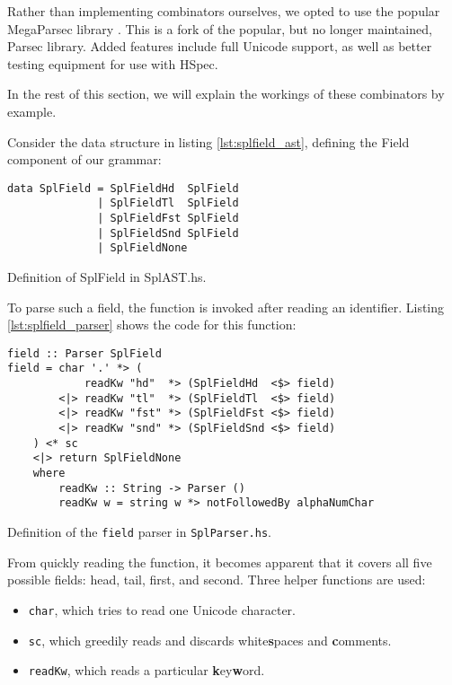 Rather than implementing combinators ourselves, we opted to use the popular MegaParsec library \cite{MegaParsec}.
This is a fork of the popular, but no longer maintained, Parsec library.
Added features include full Unicode support, as well as better testing equipment for use with HSpec.

In the rest of this section, we will explain the workings of these combinators by example.

Consider the data structure in listing \ref{lst:splfield_ast}, defining the \textsf{Field} component of our grammar:

\begin{listing}
\begin{verbatim}
data SplField = SplFieldHd  SplField
              | SplFieldTl  SplField
              | SplFieldFst SplField
              | SplFieldSnd SplField
              | SplFieldNone
\end{verbatim}
\caption{Definition of SplField in SplAST.hs.}
\label{lst:splfield_ast}
\end{listing}

To parse such a field, the  function is invoked after reading an identifier.
Listing \ref{lst:splfield_parser} shows the code for this function:

\begin{listing}
\begin{verbatim}
field :: Parser SplField
field = char '.' *> (
            readKw "hd"  *> (SplFieldHd  <$> field)
        <|> readKw "tl"  *> (SplFieldTl  <$> field)
        <|> readKw "fst" *> (SplFieldFst <$> field)
        <|> readKw "snd" *> (SplFieldSnd <$> field)
    ) <* sc
    <|> return SplFieldNone
    where
        readKw :: String -> Parser ()
        readKw w = string w *> notFollowedBy alphaNumChar
\end{verbatim}
\caption{Definition of the \texttt{field} parser in \texttt{SplParser.hs}.}
\label{lst:splfield_parser}
\end{listing}

From quickly reading the function, it becomes apparent that it covers all five possible fields: head, tail, first, and second.
Three helper functions are used:
\begin{itemize}
	\setlength{\itemsep}{0pt}
	\item \texttt{char}, which tries to read one Unicode character.
	\item \texttt{sc}, which greedily reads and discards white\textbf{s}paces and \textbf{c}omments.
	\item \texttt{readKw}, which reads a particular \textbf{k}ey\textbf{w}ord.
\end{itemize}

